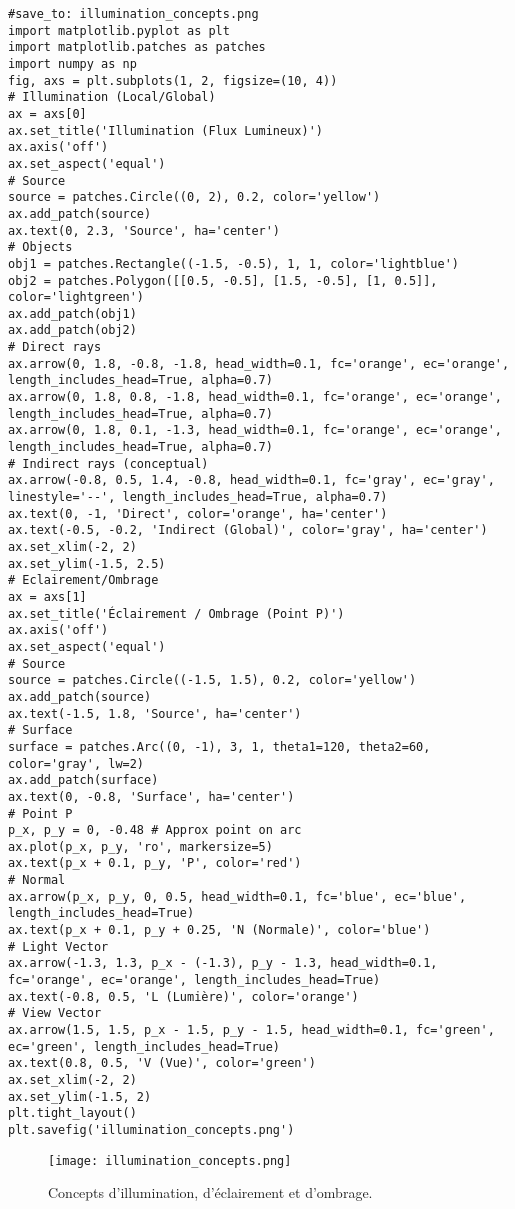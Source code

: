\begin{verbatim}
#save_to: illumination_concepts.png
import matplotlib.pyplot as plt
import matplotlib.patches as patches
import numpy as np
fig, axs = plt.subplots(1, 2, figsize=(10, 4))
# Illumination (Local/Global)
ax = axs[0]
ax.set_title('Illumination (Flux Lumineux)')
ax.axis('off')
ax.set_aspect('equal')
# Source
source = patches.Circle((0, 2), 0.2, color='yellow')
ax.add_patch(source)
ax.text(0, 2.3, 'Source', ha='center')
# Objects
obj1 = patches.Rectangle((-1.5, -0.5), 1, 1, color='lightblue')
obj2 = patches.Polygon([[0.5, -0.5], [1.5, -0.5], [1, 0.5]], color='lightgreen')
ax.add_patch(obj1)
ax.add_patch(obj2)
# Direct rays
ax.arrow(0, 1.8, -0.8, -1.8, head_width=0.1, fc='orange', ec='orange', length_includes_head=True, alpha=0.7)
ax.arrow(0, 1.8, 0.8, -1.8, head_width=0.1, fc='orange', ec='orange', length_includes_head=True, alpha=0.7)
ax.arrow(0, 1.8, 0.1, -1.3, head_width=0.1, fc='orange', ec='orange', length_includes_head=True, alpha=0.7)
# Indirect rays (conceptual)
ax.arrow(-0.8, 0.5, 1.4, -0.8, head_width=0.1, fc='gray', ec='gray', linestyle='--', length_includes_head=True, alpha=0.7)
ax.text(0, -1, 'Direct', color='orange', ha='center')
ax.text(-0.5, -0.2, 'Indirect (Global)', color='gray', ha='center')
ax.set_xlim(-2, 2)
ax.set_ylim(-1.5, 2.5)
# Eclairement/Ombrage
ax = axs[1]
ax.set_title('Éclairement / Ombrage (Point P)')
ax.axis('off')
ax.set_aspect('equal')
# Source
source = patches.Circle((-1.5, 1.5), 0.2, color='yellow')
ax.add_patch(source)
ax.text(-1.5, 1.8, 'Source', ha='center')
# Surface
surface = patches.Arc((0, -1), 3, 1, theta1=120, theta2=60, color='gray', lw=2)
ax.add_patch(surface)
ax.text(0, -0.8, 'Surface', ha='center')
# Point P
p_x, p_y = 0, -0.48 # Approx point on arc
ax.plot(p_x, p_y, 'ro', markersize=5)
ax.text(p_x + 0.1, p_y, 'P', color='red')
# Normal
ax.arrow(p_x, p_y, 0, 0.5, head_width=0.1, fc='blue', ec='blue', length_includes_head=True)
ax.text(p_x + 0.1, p_y + 0.25, 'N (Normale)', color='blue')
# Light Vector
ax.arrow(-1.3, 1.3, p_x - (-1.3), p_y - 1.3, head_width=0.1, fc='orange', ec='orange', length_includes_head=True)
ax.text(-0.8, 0.5, 'L (Lumière)', color='orange')
# View Vector
ax.arrow(1.5, 1.5, p_x - 1.5, p_y - 1.5, head_width=0.1, fc='green', ec='green', length_includes_head=True)
ax.text(0.8, 0.5, 'V (Vue)', color='green')
ax.set_xlim(-2, 2)
ax.set_ylim(-1.5, 2)
plt.tight_layout()
plt.savefig('illumination_concepts.png')
\end{verbatim}
\begin{figure}[H]
\centering
\texttt{[image: illumination\_concepts.png]}
\caption{Concepts d'illumination, d'éclairement et d'ombrage.}
\label{fig:illumination_concepts}
\end{figure}

